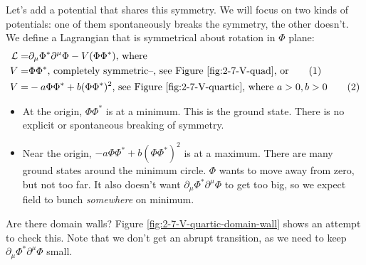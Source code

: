 \documentclass[]{article}
\newcommand\numberthis{\addtocounter{equation}{1}\tag{\theequation}}
\begin{document}
Let's add a potential that shares this symmetry. We will focus on two kinds of potentials: one of them spontaneously breaks the symmetry, the other doesn't. We define a Lagrangian that is symmetrical about rotation in $\Phi$ plane:
\begin{align*}
\mathcal{L} =&  \partial_\mu \Phi^* \partial^\mu \Phi -V(\Phi \Phi^*) \text{, where}\\
V =& \Phi \Phi^* \text{, completely symmetric--\text{, see Figure \ref{fig:2-7-V-quad}}, or} \numberthis \label{eq:symmetric}\\
V=& -a \Phi \Phi^* + b (\Phi \Phi^*)^2 \text{, see Figure \ref{fig:2-7-V-quartic}} \text{, where $a>0,b>0$}\numberthis \label{eq:breakable:symmetric}
\end{align*}

\begin{itemize}
	\item At the origin, $\Phi \Phi^*$  is at a minimum. This is the ground state. There is no explicit or spontaneous breaking of symmetry.
	\item Near the origin, $-a \Phi \Phi^* + b (\Phi \Phi^*)^2$ is at a maximum. There are many ground states around the minimum circle. $\Phi$ wants to move away from zero, but not too far. It also doesn't want $\partial_\mu \Phi^* \partial^\mu \Phi$ to get too big, so we expect field to bunch \emph{somewhere} on minimum.
\end{itemize}

Are there domain walls? Figure \ref{fig:2-7-V-quartic-domain-wall} shows an attempt to check this. Note that we don't get an abrupt transition, as we need to keep $\partial_\mu \Phi^* \partial^\mu \Phi$ small.
\end{document}
